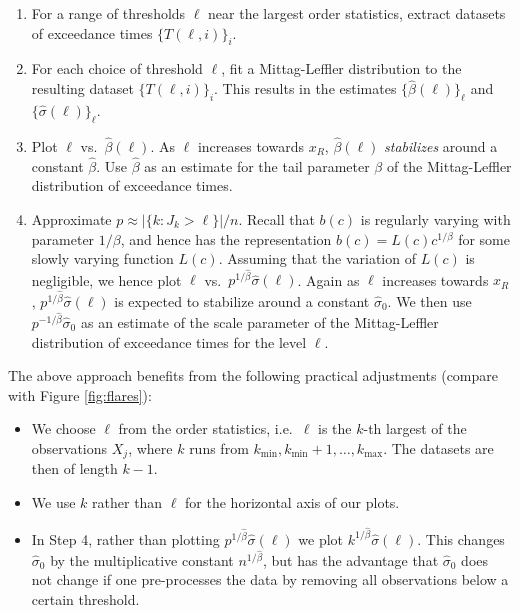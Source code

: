 \documentclass[]{elsarticle} %
\begin{document}
\begin{enumerate}
\def\labelenumi{\arabic{enumi}.}
\item
  For a range of thresholds \(\ell\) near the largest order statistics,
  extract datasets of exceedance times \(\{T(\ell, i)\}_i\).
\item
  For each choice of threshold \(\ell\), fit a Mittag-Leffler
  distribution to the resulting dataset \(\{T(\ell, i)\}_i\). This
  results in the estimates \(\{\hat\beta(\ell)\}_\ell\) and
  \(\{\hat \sigma(\ell)\}_\ell\).
\item
  Plot \(\ell\) vs.~\(\hat \beta(\ell)\). As \(\ell\) increases towards
  \(x_R\), \(\hat \beta(\ell)\) \emph{stabilizes} around a constant
  \(\hat \beta\). Use \(\hat \beta\) as an estimate for the tail
  parameter \(\beta\) of the Mittag-Leffler distribution of exceedance
  times.
\item
  Approximate \(p \approx |\{k: J_k > \ell\}| / n\). Recall that
  \(b(c)\) is regularly varying with parameter \(1/\beta\), and hence
  has the representation \(b(c) = L(c) c^{1/\beta}\) for some slowly
  varying function \(L(c)\). Assuming that the variation of \(L(c)\) is
  negligible, we hence plot \(\ell\)
  vs.~\(p^{1/\hat \beta} \hat \sigma(\ell)\). Again as \(\ell\)
  increases towards \(x_R\), \(p^{1/\hat \beta} \hat \sigma(\ell)\) is
  expected to stabilize around a constant \(\hat \sigma_0\). We then use
  \(p^{-1/\hat \beta} \hat \sigma_0\) as an estimate of the scale
  parameter of the Mittag-Leffler distribution of exceedance times for
  the level \(\ell\).
\end{enumerate}

The above approach benefits from the following practical adjustments
(compare with Figure \ref{fig:flares}):

\begin{itemize}
\item
  We choose \(\ell\) from the order statistics, i.e.~\(\ell\) is the
  \(k\)-th largest of the observations \(X_j\), where \(k\) runs from
  \(k_\text{min}, k_\text{min} + 1, \ldots, k_\text{max}\). The datasets
  are then of length \(k-1\).
\item
  We use \(k\) rather than \(\ell\) for the horizontal axis of our
  plots.
\item
  In Step 4, rather than plotting \(p^{1/\hat \beta} \hat \sigma(\ell)\)
  we plot \(k^{1/\hat \beta} \hat \sigma(\ell)\). This changes
  \(\hat \sigma_0\) by the multiplicative constant \(n^{1/\hat \beta}\),
  but has the advantage that \(\hat \sigma_0\) does not change if one
  pre-processes the data by removing all observations below a certain
  threshold.
\end{itemize}
\end{document}
